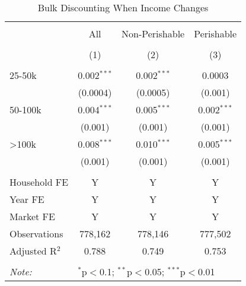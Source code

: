 
\begin{table}[!htbp] \centering 
  \caption{Bulk Discounting When Income Changes} 
  \label{tab:discountingBehaviorIncomeSwitchers} 
\begin{tabular}{@{\extracolsep{5pt}}lccc} 
\\[-1.8ex]\hline 
\hline \\[-1.8ex] 
 & All & Non-Perishable & Perishable \\ 
\\[-1.8ex] & (1) & (2) & (3)\\ 
\hline \\[-1.8ex] 
 25-50k & 0.002$^{***}$ & 0.002$^{***}$ & 0.0003 \\ 
  & (0.0004) & (0.0005) & (0.001) \\ 
  50-100k & 0.004$^{***}$ & 0.005$^{***}$ & 0.002$^{***}$ \\ 
  & (0.001) & (0.001) & (0.001) \\ 
  >100k & 0.008$^{***}$ & 0.010$^{***}$ & 0.005$^{***}$ \\ 
  & (0.001) & (0.001) & (0.001) \\ 
 \hline \\[-1.8ex] 
Household FE & Y & Y & Y \\ 
Year FE & Y & Y & Y \\ 
Market FE & Y & Y & Y \\ 
Observations & 778,162 & 778,146 & 777,502 \\ 
Adjusted R$^{2}$ & 0.788 & 0.749 & 0.753 \\ 
\hline 
\hline \\[-1.8ex] 
\textit{Note:}  & \multicolumn{3}{l}{$^{*}$p$<$0.1; $^{**}$p$<$0.05; $^{***}$p$<$0.01} \\ 
\end{tabular} 
\end{table} 
